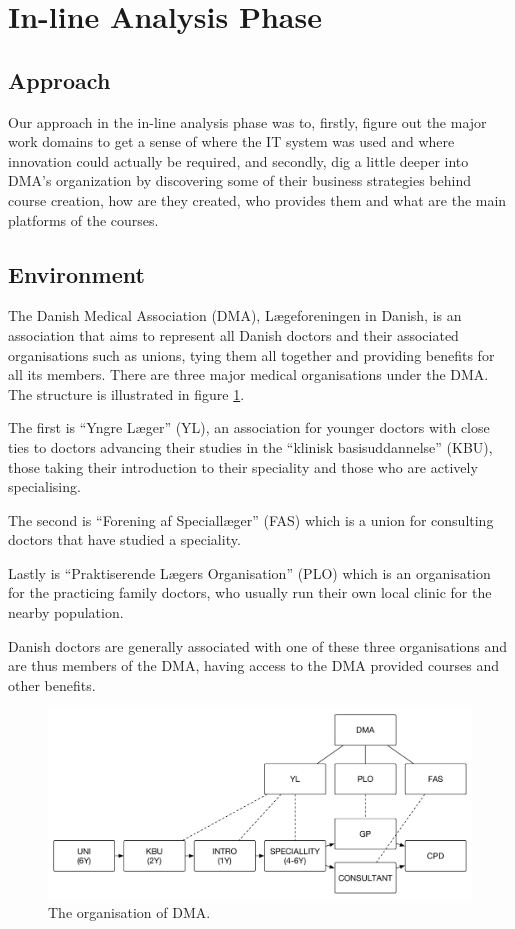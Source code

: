 \section{In-line Analysis Phase}
\subsection{Approach}
Our approach in the in-line analysis phase was to, firstly, figure out the major work domains to get a sense of where the IT system was used and where innovation could actually be required, and secondly, dig a little deeper into DMA’s organization by discovering some of their business strategies behind course creation, how are they created, who provides them and what are the main platforms of the courses.

\subsection{Environment}

The Danish Medical Association (DMA), Lægeforeningen in Danish, is an association that aims to represent all Danish doctors and their associated organisations such as unions, tying them all together and providing benefits for all its members. There are three major medical organisations under the DMA. The structure is illustrated in figure \ref{fig:dmaorganisation}.

The first is “Yngre Læger” (YL), an association for younger doctors with close ties to doctors advancing their studies in the “klinisk basisuddannelse” (KBU), those taking their introduction to their speciality and those who are actively specialising.

The second is “Forening af Speciallæger” (FAS) which is a union for consulting doctors that have studied a speciality.

Lastly is “Praktiserende Lægers Organisation” (PLO) which is an organisation for the practicing family doctors, who usually run their own local clinic for the nearby population.

Danish doctors are generally associated with one of these three organisations and are thus members of the DMA, having access to the DMA provided courses and other benefits.

\begin{figure}[h!]
 \begin{center}
  \includegraphics[width=1\textwidth]{figures/dma-structure.pdf}
  \caption{The organisation of DMA.\label{fig:dmaorganisation}}
 \end{center}
\end{figure}

